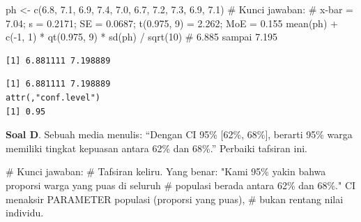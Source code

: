 \documentclass[
  indonesian,
  letterpaper,
]{book}
\newenvironment{Shaded}{\begin{snugshade}}{\end{snugshade}}
\newcommand{\CommentTok}[1]{\textcolor[rgb]{0.37,0.37,0.37}{#1}}
\newcommand{\DecValTok}[1]{\textcolor[rgb]{0.68,0.00,0.00}{#1}}
\newcommand{\FloatTok}[1]{\textcolor[rgb]{0.68,0.00,0.00}{#1}}
\newcommand{\FunctionTok}[1]{\textcolor[rgb]{0.28,0.35,0.67}{#1}}
\newcommand{\NormalTok}[1]{\textcolor[rgb]{0.00,0.23,0.31}{#1}}
\newcommand{\OtherTok}[1]{\textcolor[rgb]{0.00,0.23,0.31}{#1}}
\newcommand{\SpecialCharTok}[1]{\textcolor[rgb]{0.37,0.37,0.37}{#1}}
\begin{document}
\begin{Shaded}
\begin{Highlighting}[]
\NormalTok{ph }\OtherTok{\textless{}{-}} \FunctionTok{c}\NormalTok{(}\FloatTok{6.8}\NormalTok{, }\FloatTok{7.1}\NormalTok{, }\FloatTok{6.9}\NormalTok{, }\FloatTok{7.4}\NormalTok{, }\FloatTok{7.0}\NormalTok{, }\FloatTok{6.7}\NormalTok{, }\FloatTok{7.2}\NormalTok{, }\FloatTok{7.3}\NormalTok{, }\FloatTok{6.9}\NormalTok{, }\FloatTok{7.1}\NormalTok{)}
\CommentTok{\# Kunci jawaban:}
\CommentTok{\# x{-}bar = 7.04; s = 0.2171; SE = 0.0687; t(0.975, 9) = 2.262; MoE = 0.155}
\FunctionTok{mean}\NormalTok{(ph) }\SpecialCharTok{+} \FunctionTok{c}\NormalTok{(}\SpecialCharTok{{-}}\DecValTok{1}\NormalTok{, }\DecValTok{1}\NormalTok{) }\SpecialCharTok{*} \FunctionTok{qt}\NormalTok{(}\FloatTok{0.975}\NormalTok{, }\DecValTok{9}\NormalTok{) }\SpecialCharTok{*} \FunctionTok{sd}\NormalTok{(ph) }\SpecialCharTok{/} \FunctionTok{sqrt}\NormalTok{(}\DecValTok{10}\NormalTok{) }\CommentTok{\# 6.885 sampai 7.195}
\end{Highlighting}
\end{Shaded}

\begin{verbatim}
[1] 6.881111 7.198889
\end{verbatim}

\begin{Shaded}
\end{Shaded}

\begin{verbatim}
[1] 6.881111 7.198889
attr(,"conf.level")
[1] 0.95
\end{verbatim}

\textbf{Soal D}. Sebuah media menulis: ``Dengan CI 95\% {[}62\%,
68\%{]}, berarti 95\% warga memiliki tingkat kepuasan antara 62\% dan
68\%.'' Perbaiki tafsiran ini.

\begin{Shaded}
\begin{Highlighting}[]
\CommentTok{\# Kunci jawaban:}
\CommentTok{\# Tafsiran keliru. Yang benar: "Kami 95\% yakin bahwa proporsi warga yang puas di seluruh}
\CommentTok{\# populasi berada antara 62\% dan 68\%." CI menaksir PARAMETER populasi (proporsi yang puas),}
\CommentTok{\# bukan rentang nilai individu.}
\end{Highlighting}
\end{Shaded}
\end{document}
